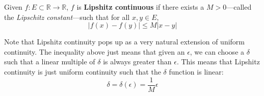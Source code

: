   \begin{definition}
    Given $f: E \subset \mathbb{R} \longrightarrow \mathbb{R}$, $f$ is \textbf{Lipshitz continuous} if there exists a $M > 0$---called the \textit{Lipschitz constant}---such that for all $x, y \in E$, 
    \begin{equation}
      |f(x) - f(y)| \leq M |x - y|
    \end{equation}
  \end{definition}

  Note that Lipshitz continuity pops up as a very natural extension of uniform continuity. The inequality above just means that given an $\epsilon$, we can choose a $\delta$ such that a linear multiple of $\delta$ is always greater than $\epsilon$. This means that Lipshitz continuity is just uniform continuity such that the $\delta$ function is linear:  
  \begin{equation}
    \delta = \delta(\epsilon) = \frac{1}{M} \epsilon
  \end{equation}

